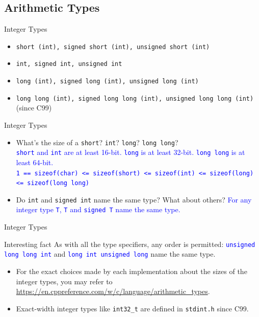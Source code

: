 \documentclass{beamer}
\newcommand{\blue}[1]{\textcolor{blue}{#1}}
\begin{document}
\subsection{Arithmetic Types}

\begin{frame}{Integer Types}
    \begin{itemize}
        \item \texttt{short (int), signed short (int), unsigned short (int)}
        \item \texttt{int, signed int, unsigned int}
        \item \texttt{long (int), signed long (int), unsigned long (int)}
        \item \texttt{long long (int), signed long long (int), unsigned long long (int)} (since C99)
    \end{itemize}
\end{frame}

\begin{frame}{Integer Types}
    \begin{itemize}
        \item What's the size of a \texttt{short}? \texttt{int}? \texttt{long}? \texttt{long long}?\\
        \pause
        \blue{\texttt{short} and \texttt{int} are at least 16-bit. \texttt{long} is at least 32-bit. \texttt{long long} is at least 64-bit.}\\
        \blue{\texttt{1 == sizeof(char) <= sizeof(short) <= sizeof(int) <= sizeof(long) <= sizeof(long long)}}
        \pause
        \item Do \texttt{int} and \texttt{signed int} name the same type? What about others?
        \pause
        \blue{For any integer type \texttt{T}, \texttt{T} and \texttt{signed T} name the same type.}
    \end{itemize}
\end{frame}

\begin{frame}{Integer Types}
    \begin{alertblock}{Interesting fact}
        As with all the type specifiers, any order is permitted: \blue{\texttt{unsigned long long int}} and \blue{\texttt{long int unsigned long}} name the same type.
    \end{alertblock}
    \pause
    \begin{itemize}
        \item For the exact choices made by each implementation about the sizes of the integer types, you may refer to\\ \url{https://en.cppreference.com/w/c/language/arithmetic_types}.
        \pause
        \item Exact-width integer types like \texttt{int32\_t} are defined in \texttt{stdint.h} since C99.
    \end{itemize}
\end{frame}
\end{document}
